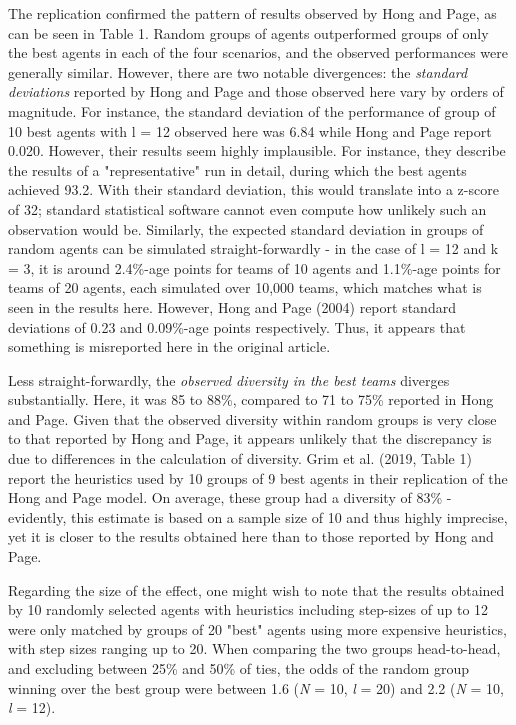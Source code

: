 The replication confirmed the pattern of results observed by Hong and Page, as can be seen in Table 1. Random groups of agents outperformed groups of only the best agents in each of the four scenarios, and the observed performances were generally similar. However, there are two notable divergences: the \textit{standard deviations} reported by Hong and Page and those observed here vary by orders of magnitude. For instance, the standard deviation of the performance of group of 10 best agents with l = 12 observed here was 6.84 while Hong and Page report 0.020. However, their results seem highly implausible. For instance, they describe the results of a "representative" run in detail, during which the best agents achieved 93.2. With their standard deviation, this would translate into a z-score of 32; standard statistical software cannot even compute how unlikely such an observation would be. Similarly, the expected standard deviation in groups of random agents can be simulated straight-forwardly - in the case of l = 12 and k = 3, it is around 2.4\%-age points for teams of 10 agents and 1.1\%-age points for teams of 20 agents, each simulated over 10,000 teams, which matches what is seen in the results here. However, Hong and Page (2004) report standard deviations of 0.23 and 0.09\%-age points respectively. Thus, it appears that something is misreported here in the original article.

Less straight-forwardly, the \textit{observed diversity in the best teams} diverges substantially. Here, it was 85 to 88\%, compared to 71 to 75\% reported in Hong and Page. Given that the observed diversity within random groups is very close to that reported by Hong and Page, it appears unlikely that the discrepancy is due to differences in the calculation of diversity. Grim et al. (2019, Table 1) report the heuristics used by 10 groups of 9 best agents in their replication of the Hong and Page model. On average, these group had a diversity of 83\% - evidently, this estimate is based on a sample size of 10 and thus highly imprecise, yet it is closer to the results obtained here than to those reported by Hong and Page.  

Regarding the size of the effect, one might wish to note that the results obtained by 10 randomly selected agents with heuristics including step-sizes of up to 12 were only matched by groups of 20 "best" agents using more expensive heuristics, with step sizes ranging up to 20. When comparing the two groups head-to-head, and excluding between 25\% and 50\% of ties, the odds of the random group winning over the best group were between 1.6 (\textit{N} = 10, \textit{l} = 20) and 2.2 (\textit{N} = 10, \textit{l} = 12).

